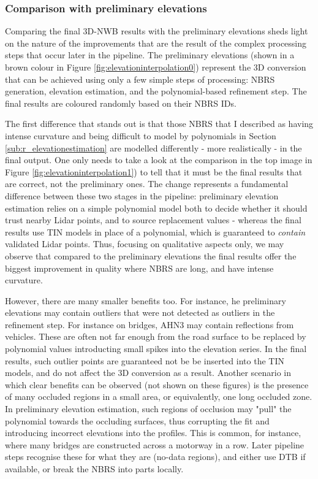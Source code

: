 \subsubsection{Comparison with preliminary elevations}

Comparing the final 3D-NWB results with the preliminary elevations sheds light on the nature of the improvements that are the result of the complex processing steps that occur later in the pipeline. The preliminary elevations (shown in a brown colour in Figure \ref{fig:elevationinterpolation0}) represent the 3D conversion that can be achieved using only a few simple steps of processing: NBRS generation, elevation estimation, and the polynomial-based refinement step. The final results are coloured randomly based on their NBRS IDs.

The first difference that stands out is that those NBRS that I described as having intense curvature and being difficult to model by polynomials in Section \ref{sub:r_elevationestimation} are modelled differently - more realistically - in the final output. One only needs to take a look at the comparison in the top image in Figure \ref{fig:elevationinterpolation1}) to tell that it must be the final results that are correct, not the preliminary ones. The change represents a fundamental difference between these two stages in the pipeline: preliminary elevation estimation relies on a simple polynomial model both to decide whether it should trust nearby Lidar points, and to source replacement values - whereas the final results use TIN models in place of a polynomial, which is guaranteed to \textit{contain} validated Lidar points. Thus, focusing on qualitative aspects only, we may observe that compared to the preliminary elevations the final results offer the biggest improvement in quality where NBRS are long, and have intense curvature.

However, there are many smaller benefits too. For instance, he preliminary elevations may contain outliers that were not detected as outliers in the refinement step. For instance on bridges, AHN3 may contain reflections from vehicles. These are often not far enough from the road surface to be replaced by polynomial values introducting small spikes into the elevation series. In the final results, such outlier points are guaranteed not be be inserted into the TIN models, and do not affect the 3D conversion as a result. Another scenario in which clear benefits can be observed (not shown on these figures) is the presence of many occluded regions in a small area, or equivalently, one long occluded zone. In preliminary elevation estimation, such regions of occlusion may "pull" the polynomial towards the occluding surfaces, thus corrupting the fit and introducing incorrect elevations into the profiles. This is common, for instance, where many bridges are constructed across a motorway in a row. Later pipeline steps recognise these for what they are (no-data regions), and either use DTB if available, or break the NBRS into parts locally.

